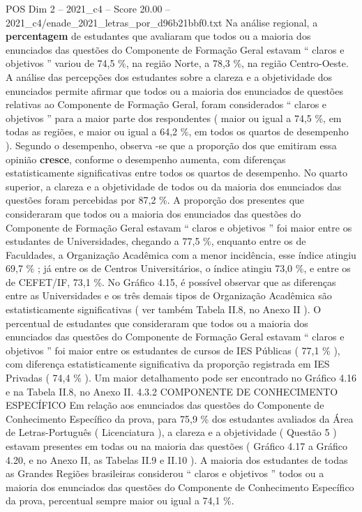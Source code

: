 \begin{textsample}{POS Dim 2 – 2021\_c4 – Score 20.00 – 2021\_c4/enade\_2021\_letras\_por\_d96b21bbf0.txt}
Na análise regional, a \textbf{percentagem} de estudantes que avaliaram que todos ou a maioria dos enunciados das questões do Componente de Formação Geral estavam “ claros e objetivos ” variou de 74,5 \%, na região Norte, a 78,3 \%, na região Centro-Oeste.
A análise das percepções dos estudantes sobre a clareza e a objetividade dos enunciados permite afirmar que todos ou a maioria dos enunciados de questões relativas ao Componente de Formação Geral, foram considerados “ claros e objetivos ” para a maior parte dos respondentes ( maior ou igual a 74,5 \%, em todas as regiões, e maior ou igual a 64,2 \%, em todos os quartos de desempenho ).
Segundo o desempenho, observa -se que a proporção dos que emitiram essa opinião \textbf{cresce}, conforme o desempenho aumenta, com diferenças estatisticamente significativas entre todos os quartos de desempenho.
No quarto superior, a clareza e a objetividade de todos ou da maioria dos enunciados das questões foram percebidas por 87,2 \%.
A proporção dos presentes que consideraram que todos ou a maioria dos enunciados das questões do Componente de Formação Geral estavam “ claros e objetivos ” foi maior entre os estudantes de Universidades, chegando a 77,5 \%, enquanto entre os de Faculdades, a Organização Acadêmica com a menor incidência, esse índice atingiu 69,7 \% ; já entre os de Centros Universitários, o índice atingiu 73,0 \%, e entre os de CEFET/IF, 73,1 \%.
No Gráfico 4.15, é possível observar que as diferenças entre as Universidades e os três demais tipos de Organização Acadêmica são estatisticamente significativas ( ver também Tabela II.8, no Anexo II ).
O percentual de estudantes que consideraram que todos ou a maioria dos enunciados das questões do Componente de Formação Geral estavam “ claros e objetivos ” foi maior entre os estudantes de cursos de IES Públicas ( 77,1 \% ), com diferença estatisticamente significativa da proporção registrada em IES Privadas ( 74,4 \% ).
Um maior detalhamento pode ser encontrado no Gráfico 4.16 e na Tabela II.8, no Anexo II. 4.3.2 COMPONENTE DE CONHECIMENTO ESPECÍFICO Em relação aos enunciados das questões do Componente de Conhecimento Específico da prova, para 75,9 \% dos estudantes avaliados da Área de Letras-Português ( Licenciatura ), a clareza e a objetividade ( Questão 5 ) estavam presentes em todas ou na maioria das questões ( Gráfico 4.17 a Gráfico 4.20, e no Anexo II, as Tabelas II.9 e II.10 ).
A maioria dos estudantes de todas as Grandes Regiões brasileiras considerou “ claros e objetivos ” todos ou a maioria dos enunciados das questões do Componente de Conhecimento Específico da prova, percentual sempre maior ou igual a 74,1 \%.

\end{textsample}
